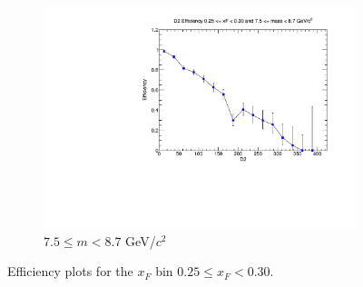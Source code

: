 \documentclass[11pt]{article}
\begin{document}
\begin{figure}[p]
\begin{subfigure}[b]{0.32\textwidth}
        \includegraphics[width=\textwidth]{./kTrackerEfficiencyPlots/D2_Efficiency_xF5_mass10.pdf}
        \caption{$7.5 \leq m < 8.7$ GeV/$c^2$}
    \end{subfigure}
    \caption{Efficiency plots for the $x_F$ bin $0.25 \leq x_F < 0.30$.}
\end{figure}
\end{document}

